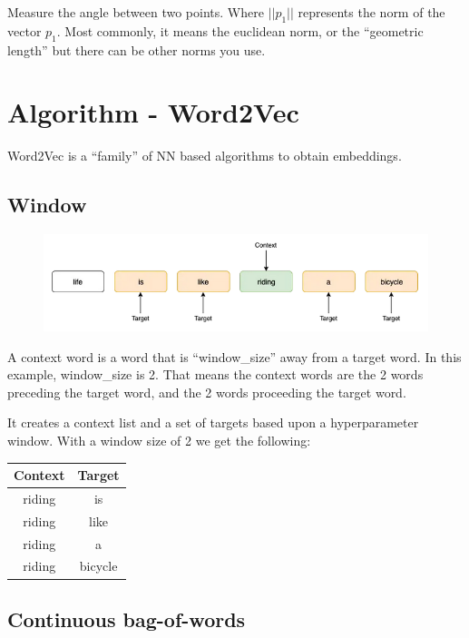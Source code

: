 \documentclass[11pt]{article}
\begin{document}
Measure the angle between two points. Where $||p_1||$ represents the norm of the vector $p_1$. Most commonly, it means the euclidean norm, or the ``geometric length'' but there can be other norms you use.

\section{Algorithm - Word2Vec}

Word2Vec is a ``family'' of NN based algorithms to obtain embeddings. 

\subsection{Window}

\begin{figure}[H]
    \centering
    \includegraphics[width=.6\linewidth]{figures/window.png}
\end{figure}

A context word is a word that is ``window\_size'' away from a target word. In this example, window\_size is 2. That means the context words are the 2 words preceding the target word, and the 2 words proceeding the target word.

It creates a context list and a set of targets based upon a hyperparameter window. With a window size of 2 we get the following:

\begin{table}[h]
    \centering
    \begin{tabular}{|c|c|}
        \hline
        \textbf{Context} & \textbf{Target} \\
        \hline
        riding & is \\ 
        riding & like \\
        riding & a \\ 
        riding & bicycle \\ 
        \hline
    \end{tabular}
\end{table}

\subsection{Continuous bag-of-words}
\end{document}

